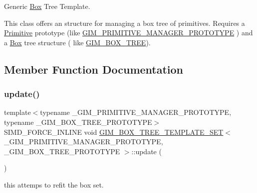Generic \hyperlink{classBox}{Box} Tree Template. 

This class offers an structure for managing a box tree of primitives. Requires a \hyperlink{classPrimitive}{Primitive} prototype (like \hyperlink{classGIM__PRIMITIVE__MANAGER__PROTOTYPE}{G\+I\+M\+\_\+\+P\+R\+I\+M\+I\+T\+I\+V\+E\+\_\+\+M\+A\+N\+A\+G\+E\+R\+\_\+\+P\+R\+O\+T\+O\+T\+Y\+PE} ) and a \hyperlink{classBox}{Box} tree structure ( like \hyperlink{classGIM__BOX__TREE}{G\+I\+M\+\_\+\+B\+O\+X\+\_\+\+T\+R\+EE}). 

\subsection{Member Function Documentation}
\mbox{\label{classGIM__BOX__TREE__TEMPLATE__SET_a0f5f2b683e561a4e05d912cb4973dac4}} 
\subsubsection{\texorpdfstring{update()}{update()}\hspace{0.1cm}{\footnotesize\ttfamily [1/2]}}
{\footnotesize\ttfamily template$<$typename \+\_\+\+G\+I\+M\+\_\+\+P\+R\+I\+M\+I\+T\+I\+V\+E\+\_\+\+M\+A\+N\+A\+G\+E\+R\+\_\+\+P\+R\+O\+T\+O\+T\+Y\+PE, typename \+\_\+\+G\+I\+M\+\_\+\+B\+O\+X\+\_\+\+T\+R\+E\+E\+\_\+\+P\+R\+O\+T\+O\+T\+Y\+PE$>$ \\
S\+I\+M\+D\+\_\+\+F\+O\+R\+C\+E\+\_\+\+I\+N\+L\+I\+NE void \hyperlink{classGIM__BOX__TREE__TEMPLATE__SET}{G\+I\+M\+\_\+\+B\+O\+X\+\_\+\+T\+R\+E\+E\+\_\+\+T\+E\+M\+P\+L\+A\+T\+E\+\_\+\+S\+ET}$<$ \+\_\+\+G\+I\+M\+\_\+\+P\+R\+I\+M\+I\+T\+I\+V\+E\+\_\+\+M\+A\+N\+A\+G\+E\+R\+\_\+\+P\+R\+O\+T\+O\+T\+Y\+PE, \+\_\+\+G\+I\+M\+\_\+\+B\+O\+X\+\_\+\+T\+R\+E\+E\+\_\+\+P\+R\+O\+T\+O\+T\+Y\+PE $>$\+::update (\begin{DoxyParamCaption}{ }\end{DoxyParamCaption})\hspace{0.3cm}{\ttfamily [inline]}}



this attemps to refit the box set. 

